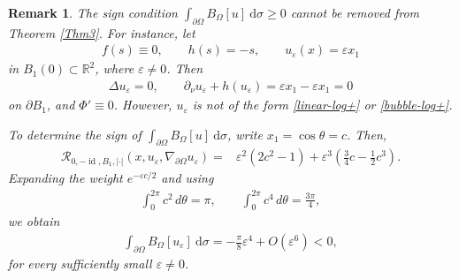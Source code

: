 \documentclass[10pt,a4paper]{amsart}
\numberwithin{equation}{section}
\newtheorem{rmk}[thm]{Remark}
\newcommand{\pa}{\partial}
\newcommand{\R}{\mathbb{R}}
\newcommand{\calR}{\mathcal{R}}
\begin{document}
\begin{rmk}\label{ex:BR-is-essential}
The sign condition $\int_{\pa \Omega} B_{\Omega}[u] \ \text{d} \sigma \geq 0$ cannot be removed from Theorem \ref{Thm3}. For instance, let
\begin{align*}
       f(s)\equiv0,\qquad h(s)=-s,
       \qquad u_\varepsilon(x)=\varepsilon x_1
\end{align*}
in $B_1(0)\subset\R^2$, where $\varepsilon\ne0$.  Then
\begin{align*}
       \Delta u_\varepsilon=0,
       \qquad
       \partial_\nu u_\varepsilon+h(u_\varepsilon)
       =\varepsilon x_1-\varepsilon x_1=0
\end{align*}
on $\partial B_1$, and $\Phi'\equiv0$. However, $u_{\varepsilon}$ is not of the form \eqref{linear-log+} or \eqref{bubble-log+}.

To determine the sign of $\int_{\pa \Omega} B_{\Omega}[u] \ \text{d} \sigma$, write $x_1=\cos\theta=c$. Then,
\begin{align*}
    \calR_{0,-\operatorname{id},B_1,|\cdot|}
       (x,u_\varepsilon,\nabla_{\pa \Omega} u_\varepsilon) = &\varepsilon^2 (2c^2-1) + \varepsilon^3 \left(\frac{3}{4}c - \frac{1}{2}c^3\right).
\end{align*}
Expanding the weight $e^{-\varepsilon c/2}$ and using
\begin{align*}
       \int_0^{2\pi}c^2\,d\theta=\pi,
       \qquad
       \int_0^{2\pi}c^4\,d\theta=\frac{3\pi}{4},
\end{align*}
we obtain
\begin{align*}
      \int_{\pa \Omega} B_{\Omega}[u_{\varepsilon}] \ \text{d} \sigma
       =-\frac\pi8\varepsilon^4+O(\varepsilon^6)<0,
\end{align*}
for every sufficiently small $\varepsilon\ne0$.
\end{rmk}






\end{document}
